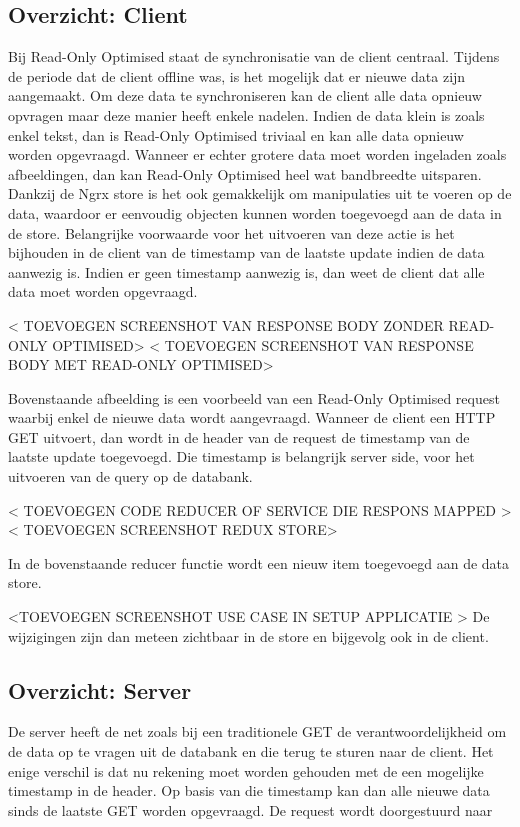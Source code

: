 \subsection{Overzicht: Client}
Bij Read-Only Optimised staat de synchronisatie van de client centraal. Tijdens de periode dat de client offline was, is het mogelijk dat er nieuwe data zijn aangemaakt. Om deze data te synchroniseren kan de client alle data opnieuw opvragen maar deze manier heeft enkele nadelen. Indien de data klein is zoals enkel tekst, dan is Read-Only Optimised triviaal en kan alle data opnieuw worden opgevraagd. Wanneer er echter grotere data moet worden ingeladen zoals afbeeldingen, dan kan Read-Only Optimised heel wat bandbreedte uitsparen. Dankzij de Ngrx store is het ook gemakkelijk om manipulaties uit te voeren op de data, waardoor er eenvoudig objecten kunnen worden toegevoegd aan de data in de store. Belangrijke voorwaarde voor het uitvoeren van deze actie is het bijhouden in de client van de timestamp van de laatste update indien de data aanwezig is. Indien er geen timestamp aanwezig is, dan weet de client dat alle data moet worden opgevraagd.

< TOEVOEGEN SCREENSHOT VAN RESPONSE  BODY ZONDER READ-ONLY OPTIMISED>
< TOEVOEGEN SCREENSHOT VAN RESPONSE  BODY MET READ-ONLY OPTIMISED>

Bovenstaande afbeelding is een voorbeeld van een Read-Only Optimised request waarbij enkel de nieuwe data wordt aangevraagd. Wanneer de client een HTTP GET uitvoert, dan wordt in de header van de request de timestamp van de laatste update toegevoegd. Die timestamp is belangrijk server side, voor het uitvoeren van de query op de databank.

< TOEVOEGEN CODE REDUCER OF SERVICE DIE RESPONS MAPPED >
< TOEVOEGEN SCREENSHOT REDUX STORE>

In de bovenstaande reducer functie wordt een nieuw item toegevoegd aan de data store.

<TOEVOEGEN SCREENSHOT USE CASE IN SETUP APPLICATIE >
De wijzigingen zijn dan meteen zichtbaar in de store en bijgevolg ook in de client.
\subsection{Overzicht: Server}
De server heeft de net zoals bij een traditionele GET de verantwoordelijkheid om de data op te vragen uit de databank en die terug te sturen naar de client. Het enige verschil is dat nu rekening moet worden gehouden met de een mogelijke timestamp in de header. Op basis van die timestamp kan dan alle nieuwe data sinds de laatste GET worden opgevraagd. De request wordt doorgestuurd naar 

